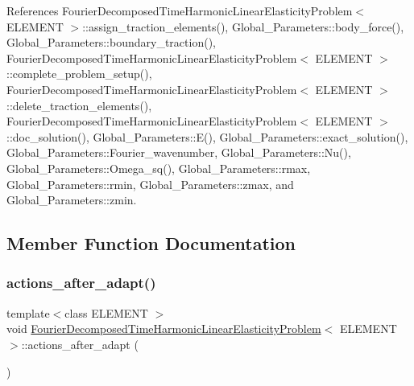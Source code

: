 References Fourier\+Decomposed\+Time\+Harmonic\+Linear\+Elasticity\+Problem$<$ E\+L\+E\+M\+E\+N\+T $>$\+::assign\+\_\+traction\+\_\+elements(), Global\+\_\+\+Parameters\+::body\+\_\+force(), Global\+\_\+\+Parameters\+::boundary\+\_\+traction(), Fourier\+Decomposed\+Time\+Harmonic\+Linear\+Elasticity\+Problem$<$ E\+L\+E\+M\+E\+N\+T $>$\+::complete\+\_\+problem\+\_\+setup(), Fourier\+Decomposed\+Time\+Harmonic\+Linear\+Elasticity\+Problem$<$ E\+L\+E\+M\+E\+N\+T $>$\+::delete\+\_\+traction\+\_\+elements(), Fourier\+Decomposed\+Time\+Harmonic\+Linear\+Elasticity\+Problem$<$ E\+L\+E\+M\+E\+N\+T $>$\+::doc\+\_\+solution(), Global\+\_\+\+Parameters\+::\+E(), Global\+\_\+\+Parameters\+::exact\+\_\+solution(), Global\+\_\+\+Parameters\+::\+Fourier\+\_\+wavenumber, Global\+\_\+\+Parameters\+::\+Nu(), Global\+\_\+\+Parameters\+::\+Omega\+\_\+sq(), Global\+\_\+\+Parameters\+::rmax, Global\+\_\+\+Parameters\+::rmin, Global\+\_\+\+Parameters\+::zmax, and Global\+\_\+\+Parameters\+::zmin.



\subsection{Member Function Documentation}
\mbox{\label{classFourierDecomposedTimeHarmonicLinearElasticityProblem_a5b9d18ea43b802e8a2b1f3b50140054b}} 
\subsubsection{\texorpdfstring{actions\+\_\+after\+\_\+adapt()}{actions\_after\_adapt()}\hspace{0.1cm}{\footnotesize\ttfamily [1/2]}}
{\footnotesize\ttfamily template$<$class E\+L\+E\+M\+E\+NT $>$ \\
void \hyperlink{classFourierDecomposedTimeHarmonicLinearElasticityProblem}{Fourier\+Decomposed\+Time\+Harmonic\+Linear\+Elasticity\+Problem}$<$ E\+L\+E\+M\+E\+NT $>$\+::actions\+\_\+after\+\_\+adapt (\begin{DoxyParamCaption}{ }\end{DoxyParamCaption})\hspace{0.3cm}{\ttfamily [inline]}}



